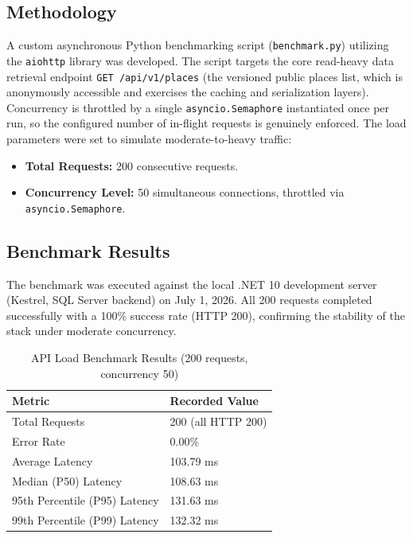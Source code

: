 \subsection{Methodology}
A custom asynchronous Python benchmarking script (\texttt{benchmark.py}) utilizing the \texttt{aiohttp} library was developed. The script targets the core read-heavy data retrieval endpoint \texttt{GET /api/v1/places} (the versioned public places list, which is anonymously accessible and exercises the caching and serialization layers). Concurrency is throttled by a single \texttt{asyncio.Semaphore} instantiated once per run, so the configured number of in-flight requests is genuinely enforced. The load parameters were set to simulate moderate-to-heavy traffic:
\begin{itemize}
    \item \textbf{Total Requests:} 200 consecutive requests.
    \item \textbf{Concurrency Level:} 50 simultaneous connections, throttled via \texttt{asyncio.Semaphore}.
\end{itemize}

\subsection{Benchmark Results}
The benchmark was executed against the local .NET 10 development server (Kestrel, SQL Server backend) on July 1, 2026. All 200 requests completed successfully with a 100\% success rate (HTTP 200), confirming the stability of the stack under moderate concurrency.

\begin{table}[H]
\centering
\begin{tabular}{|l|l|}
\hline
\textbf{Metric} & \textbf{Recorded Value} \\ \hline
Total Requests & 200 (all HTTP 200) \\ \hline
Error Rate & 0.00\% \\ \hline
Average Latency & 103.79 ms \\ \hline
Median (P50) Latency & 108.63 ms \\ \hline
95th Percentile (P95) Latency & 131.63 ms \\ \hline
99th Percentile (P99) Latency & 132.32 ms \\ \hline
\end{tabular}
\caption{API Load Benchmark Results (200 requests, concurrency 50)}
\label{tab:benchmark}
\end{table}

